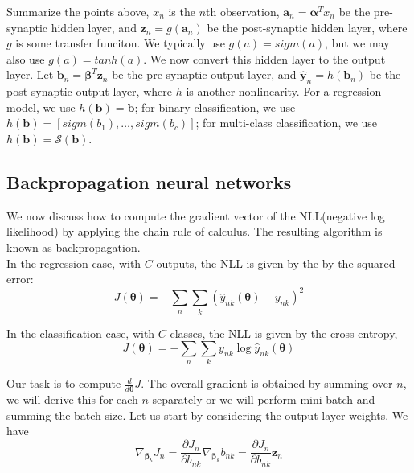 \documentclass[12pt,a4paper]{article}%
\theoremstyle{definition}
\theoremstyle{plain}
\numberwithin{equation}{section}
\begin{document}
Summarize the points above, $x_{n}$ is the $n$th observation, $\mathbf{a}_{n} = \boldsymbol{\alpha}^{T} x_{n}$ be the pre-synaptic hidden layer, and $\mathbf{z}_{n} = g( \mathbf{a}_{n})$ be the post-synaptic
hidden layer, where $g$ is some transfer funciton. We typically use $g(a)=sigm(a)$, but we may also use $g(a)=tanh(a)$. We now convert this hidden layer to the output layer. Let $\mathbf{b}_{n} = \boldsymbol{\beta}^{T} \mathbf{z}_{n}$ be the pre-synaptic output layer, and $\hat{\mathbf{y}}_{n}=h(\mathbf{b}_{n})$ be the post-synaptic output layer, where $h$ is another nonlinearity. 
For a regression model, we use $h(\mathbf{b})= \mathbf{b}$; for binary classification, we use $h(\mathbf{b})= [sigm(b_{1}),\dots,sigm(b_{c})]$; for multi-class classification, we use $h(\mathbf{b})= \mathcal{S}(\mathbf{b})$.


\subsection{Backpropagation neural networks}
We now discuss how to compute the gradient vector of the NLL(negative log likelihood) by applying the chain rule of calculus. The resulting algorithm is known as backpropagation.~\\

In the regression case, with $C$ outputs, the NLL is given by the by the squared error:
\begin{equation}
J(\boldsymbol{\theta}) = -\sum\limits_{n}\sum\limits_{k}(\hat{y}_{nk}(\boldsymbol{\theta})-y_{nk})^{2}
\end{equation}

In the classification case, with $C$ classes, the NLL is given by the cross entropy,
\begin{equation}
J(\boldsymbol{\theta}) = -\sum\limits_{n} \sum\limits_{k} y_{nk} \log \hat{y}_{nk}(\boldsymbol{\theta}) 
\end{equation}

Our task is to compute $\frac{d}{d\boldsymbol{\theta}}J$. The overall gradient is obtained by summing over $n$, we will derive this for each $n$ separately or we will perform mini-batch and summing the batch size.
Let us start by considering the output layer weights. We have
\begin{equation}
\nabla_{\boldsymbol{\beta}_{k}} J_{n} = \frac{\partial J_{n}}{\partial b_{nk}} \nabla_{\boldsymbol{\beta}_{k}} b_{nk} = \frac{\partial J_{n}}{\partial b_{nk}} \mathbf{z}_{n}
\end{equation}
\end{document}

